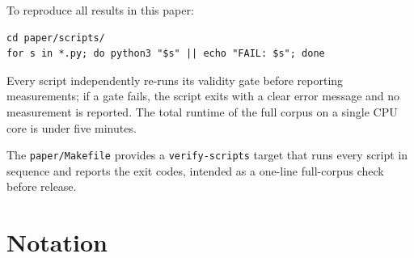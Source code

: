 \documentclass[12pt,a4paper]{article}
\theoremstyle{definition}
\theoremstyle{remark}
\begin{document}
To reproduce all results in this paper:
\begin{verbatim}
cd paper/scripts/
for s in *.py; do python3 "$s" || echo "FAIL: $s"; done
\end{verbatim}
Every script independently re-runs its validity gate before reporting
measurements; if a gate fails, the script exits with a clear error
message and no measurement is reported. The total runtime of the full
corpus on a single CPU core is under five minutes.

The \texttt{paper/Makefile} provides a \texttt{verify-scripts} target
that runs every script in sequence and reports the exit codes,
intended as a one-line full-corpus check before release.

\appendix

\section{Notation}\label{app:notation}
\end{document}
